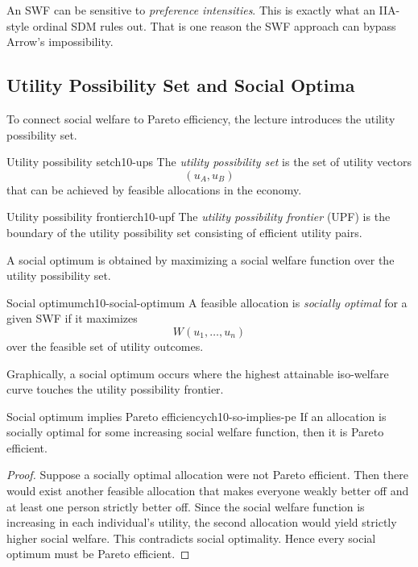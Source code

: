 \begin{examtip}
An SWF can be sensitive to \emph{preference intensities}. This is exactly what an IIA-style ordinal SDM rules out. That is one reason the SWF approach can bypass Arrow's impossibility.
\end{examtip}

\subsection{Utility Possibility Set and Social Optima}

To connect social welfare to Pareto efficiency, the lecture introduces the utility possibility set.

\begin{definition}{Utility possibility set}{ch10-ups}
The \emph{utility possibility set} is the set of utility vectors
\[
(u_A,u_B)
\]
that can be achieved by feasible allocations in the economy.
\end{definition}

\begin{definition}{Utility possibility frontier}{ch10-upf}
The \emph{utility possibility frontier} (UPF) is the boundary of the utility possibility set consisting of efficient utility pairs.
\end{definition}

A social optimum is obtained by maximizing a social welfare function over the utility possibility set.

\begin{definition}{Social optimum}{ch10-social-optimum}
A feasible allocation is \emph{socially optimal} for a given SWF if it maximizes
\[
W(u_1,\dots,u_n)
\]
over the feasible set of utility outcomes.
\end{definition}

Graphically, a social optimum occurs where the highest attainable iso-welfare curve touches the utility possibility frontier.

\begin{theorem}{Social optimum implies Pareto efficiency}{ch10-so-implies-pe}
If an allocation is socially optimal for some increasing social welfare function, then it is Pareto efficient.
\end{theorem}

\begin{proof}
Suppose a socially optimal allocation were not Pareto efficient. Then there would exist another feasible allocation that makes everyone weakly better off and at least one person strictly better off. Since the social welfare function is increasing in each individual's utility, the second allocation would yield strictly higher social welfare. This contradicts social optimality. Hence every social optimum must be Pareto efficient.
\end{proof}

